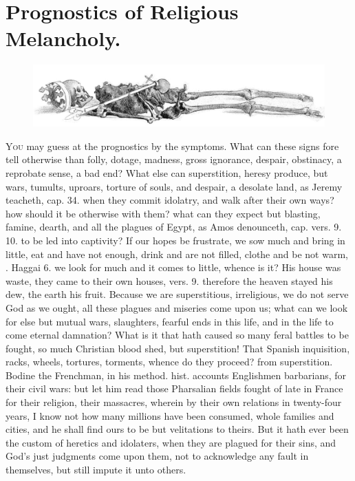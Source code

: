 {\section{Prognostics of Religious Melancholy.}
\begin{figure}[H]
  \begingroup
  \centering
  \includegraphics[keepaspectratio,width=\textwidth]{figures/skeltal-small.jpg}
  \label{fig:skeltal}
\end{figure}
\lettrine{Y}{ou} may guess at the prognostics by the symptoms. What can these signs
fore tell otherwise than folly, dotage, madness, gross ignorance,
despair, obstinacy, a reprobate sense, a bad end? What else can
superstition, heresy produce, but wars, tumults, uproars, torture of
souls, and despair, a desolate land, as Jeremy teacheth, cap.  34.
when they commit idolatry, and walk after their own ways? how should it
be otherwise with them? what can they expect but blasting, famine,
dearth, and all the plagues of Egypt, as Amos denounceth, cap. 
vers. 9. 10. to be led into captivity? If our hopes be frustrate, we
sow much and bring in little, eat and have not enough, drink and are
not filled, clothe and be not warm, \etc{}. Haggai  6. we look for much
and it comes to little, whence is it? His house was waste, they came to
their own houses, vers. 9. therefore the heaven stayed his dew, the
earth his fruit. Because we are superstitious, irreligious, we do not
serve God as we ought, all these plagues and miseries come upon us;
what can we look for else but mutual wars, slaughters, fearful ends in
this life, and in the life to come eternal damnation? What is it that
hath caused so many feral battles to be fought, so much Christian blood
shed, but superstition! That Spanish inquisition, racks, wheels,
tortures, torments, whence do they proceed? from superstition. Bodine
the Frenchman, in his method. hist. accounts Englishmen
barbarians, for their civil wars: but let him read those Pharsalian
fields fought of late in France for their religion, their
massacres, wherein by their own relations in twenty-four years, I know
not how many millions have been consumed, whole families and cities,
and he shall find ours to be but velitations to theirs. But it hath
ever been the custom of heretics and idolaters, when they are plagued
for their sins, and God's just judgments come upon them, not to
acknowledge any fault in themselves, but still impute it unto others.

}
